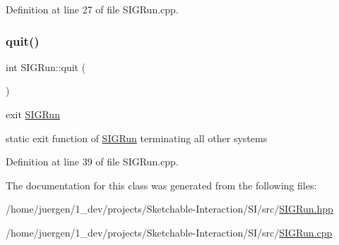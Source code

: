 Definition at line 27 of file S\+I\+G\+Run.\+cpp.

\mbox{\label{class_s_i_g_run_ab650777985ff7f5784bf59f1cdf370f5}} 
\subsubsection{\texorpdfstring{quit()}{quit()}}
{\footnotesize\ttfamily int S\+I\+G\+Run\+::quit (\begin{DoxyParamCaption}{ }\end{DoxyParamCaption})\hspace{0.3cm}{\ttfamily [static]}}



exit \mbox{\hyperlink{class_s_i_g_run}{S\+I\+G\+Run}} 

static exit function of \mbox{\hyperlink{class_s_i_g_run}{S\+I\+G\+Run}} terminating all other systems 

Definition at line 39 of file S\+I\+G\+Run.\+cpp.



The documentation for this class was generated from the following files\+:\begin{DoxyCompactItemize}
\item 
/home/juergen/1\+\_\+dev/projects/\+Sketchable-\/\+Interaction/\+S\+I/src/\mbox{\hyperlink{_s_i_g_run_8hpp}{S\+I\+G\+Run.\+hpp}}\item 
/home/juergen/1\+\_\+dev/projects/\+Sketchable-\/\+Interaction/\+S\+I/src/\mbox{\hyperlink{_s_i_g_run_8cpp}{S\+I\+G\+Run.\+cpp}}\end{DoxyCompactItemize}
